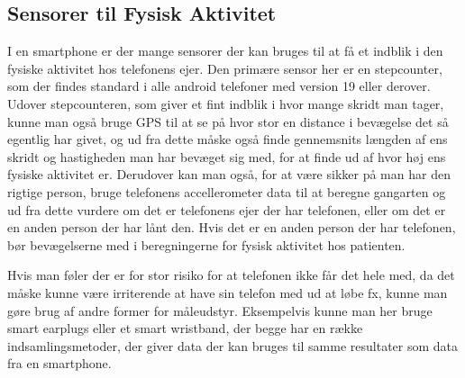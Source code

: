 \subsection{Sensorer til Fysisk Aktivitet}
I en smartphone er der mange sensorer der kan bruges til at få et indblik i den fysiske aktivitet hos telefonens ejer.
Den primære sensor her er en stepcounter, som der findes standard i alle android telefoner med version 19 eller derover.
Udover stepcounteren, som giver et fint indblik i hvor mange skridt man tager, kunne man også bruge GPS til at se på hvor stor en distance i bevægelse det så egentlig har givet, og ud fra dette måske også finde gennemsnits længden af ens skridt og hastigheden man har bevæget sig med, for at finde ud af hvor høj ens fysiske aktivitet er.
Derudover kan man også, for at være sikker på man har den rigtige person, bruge telefonens accellerometer data til at beregne gangarten og ud fra dette vurdere om det er telefonens ejer der har telefonen, eller om det er en anden person der har lånt den.
Hvis det er en anden person der har telefonen, bør bevægelserne med i beregningerne for fysisk aktivitet hos patienten.

Hvis man føler der er for stor risiko for at telefonen ikke får det hele med, da det måske kunne være irriterende at have sin telefon med ud at løbe fx, kunne man gøre brug af andre former for måleudstyr.
Eksempelvis kunne man her bruge smart earplugs eller et smart wristband, der begge har en række indsamlingsmetoder, der giver data der kan bruges til samme resultater som data fra en smartphone.
